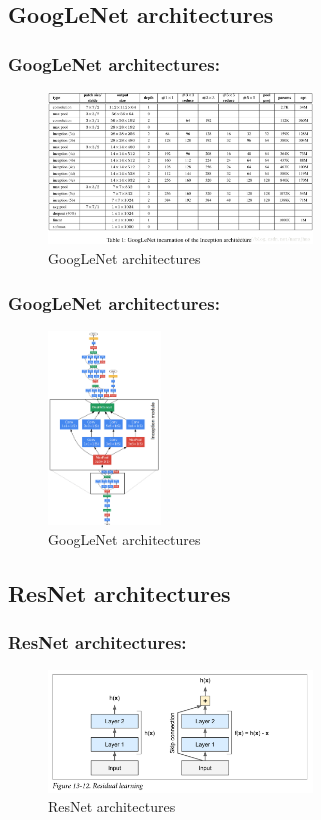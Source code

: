 \documentclass{beamer}
\begin{document}
\subsection{GoogLeNet architectures}
    \begin{frame}
    \frametitle{GoogLeNet architectures: }
         \begin{figure}[H]
            \begin{center}
                \includegraphics[width=7cm]{table13-3}
            \end{center}
        \caption{GoogLeNet architectures}
        \end{figure}
    \end{frame}

    \begin{frame}
    \frametitle{GoogLeNet architectures: }
         \begin{figure}[H]
            \begin{center}
                \includegraphics[width=3cm]{FIGURE13-3.png}
            \end{center}
        \caption{GoogLeNet architectures}
        \end{figure}
    \end{frame}

\subsection{ResNet architectures}
    \begin{frame}
    \frametitle{ResNet architectures: }
         \begin{figure}[H]
            \begin{center}
                \includegraphics[width=7cm]{FIGURE13-4.png}
            \end{center}
        \caption{ResNet architectures}
        \end{figure}
    \end{frame}
\end{document}
